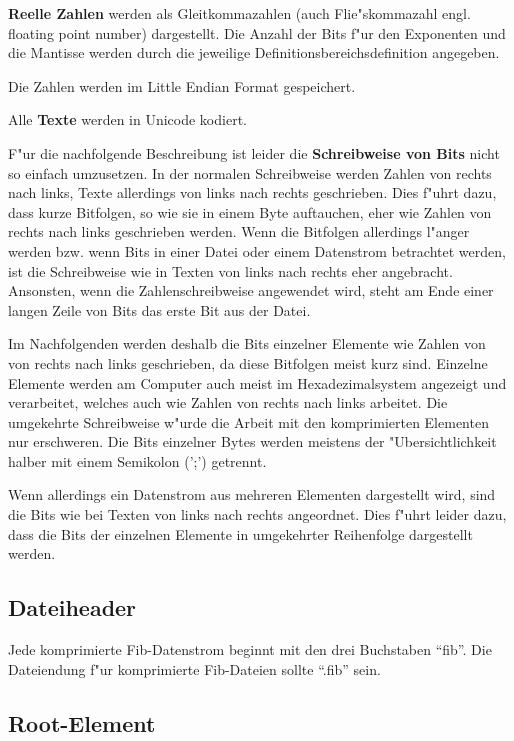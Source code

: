 

\textbf{Reelle Zahlen} werden als Gleitkommazahlen (auch Flie"skommazahl engl. floating point number) dargestellt. Die Anzahl der Bits f"ur den Exponenten und die Mantisse werden durch die jeweilige Definitionsbereichsdefinition angegeben.

Die Zahlen werden im Little Endian Format gespeichert.

Alle \textbf{Texte} werden in Unicode kodiert.


F"ur die nachfolgende Beschreibung ist leider die \textbf{Schreibweise von Bits} nicht so einfach umzusetzen. In der normalen Schreibweise werden Zahlen von rechts nach links, Texte allerdings von links nach rechts geschrieben. Dies f"uhrt dazu, dass kurze Bitfolgen, so wie sie in einem Byte auftauchen, eher wie Zahlen von rechts nach links geschrieben werden. Wenn die Bitfolgen allerdings l"anger werden bzw. wenn Bits in einer Datei oder einem Datenstrom betrachtet werden, ist die Schreibweise wie in Texten von links nach rechts eher angebracht. Ansonsten, wenn die Zahlenschreibweise angewendet wird, steht am Ende einer langen Zeile von Bits das erste Bit aus der Datei.

Im Nachfolgenden werden deshalb die Bits einzelner Elemente wie Zahlen von von rechts nach links geschrieben, da diese Bitfolgen meist kurz sind. Einzelne Elemente werden am Computer auch meist im Hexadezimalsystem angezeigt und verarbeitet, welches auch wie Zahlen von rechts nach links arbeitet. Die umgekehrte Schreibweise w"urde die Arbeit mit den komprimierten Elementen nur erschweren. Die Bits einzelner Bytes werden meistens der "Ubersichtlichkeit halber mit einem Semikolon (';') getrennt.

Wenn allerdings ein Datenstrom aus mehreren Elementen dargestellt wird, sind die Bits wie bei Texten von links nach rechts angeordnet. Dies f"uhrt leider dazu, dass die Bits der einzelnen Elemente in umgekehrter Reihenfolge dargestellt werden.


\subsection{Dateiheader}

Jede komprimierte Fib-Datenstrom beginnt mit den drei Buchstaben ``fib''. Die Dateiendung f"ur komprimierte Fib-Dateien sollte ``.fib'' sein.


\subsection{Root-Element}
\label{secCompressedRootElement}

